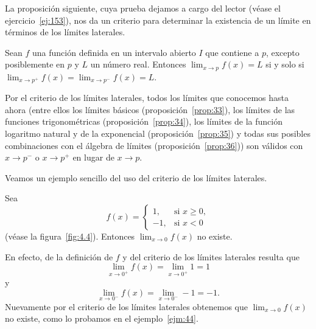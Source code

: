 \documentclass[12pt,a4paper]{book}
\begin{document}
    La proposición siguiente, cuya prueba dejamos a cargo del lector (véase el
    ejercicio~\ref{ej:153}), nos da un criterio para determinar la existencia de un límite
    en términos de los límites laterales.

    \begin{proposicion}\label{prop:42}
        Sean $f$ una función
        definida en un intervalo abierto $I$ que contiene a $p$, excepto posiblemente en $p$
        y $L$ un número real. Entonces $\lim_{x\to p}f(x)=L$ si y solo si $\lim_{x\to p^{+}}f(x)=
        \lim_{x\to p^{-}}f(x)=L$.
    \end{proposicion}

    Por el criterio de los límites laterales, todos los límites que conocemos
    hasta ahora (entre ellos los límites básicos (proposición~\ref{prop:33}), los límites de las
    funciones trigonométricas (proposición~\ref{prop:34}), los límites de la función logaritmo
    natural y de la exponencial (proposición~\ref{prop:35}) y todas sus posibles combinaciones
    con el álgebra de límites (proposición~\ref{prop:36})) son válidos con $x\to p^{-}$ o
    $x\to p^{+}$ en lugar de $x\to p$.

    Veamos un ejemplo sencillo del uso del criterio de los límites laterales.

    \begin{ejemplo}\label{ejm:55}
        Sea
        \begin{equation*}
            f(x)=\begin{cases}
                1, & \text{si }x\geq 0,\\
                -1, & \text{si }x<0
            \end{cases}
        \end{equation*}
        (véase la figura~\ref{fig:4.4}). Entonces $\lim_{x\to 0}f(x)$ no existe.

        En efecto, de la definición de $f$ y del criterio de los límites laterales resulta
        que
        \begin{equation*}
            \lim_{x\to 0^{+}}f(x)=\lim_{x\to 0^{+}}1=1
        \end{equation*}
        y
        \begin{equation*}
            \lim_{x\to 0^{-}}f(x)=\lim_{x\to 0^{-}}-1=-1.
        \end{equation*}
        Nuevamente por el criterio de los límites laterales obtenemos que $\lim_{x\to 0}f(x)$
        no existe, como lo probamos en el ejemplo~\ref{ejm:44}.
    \end{ejemplo}
\end{document}

